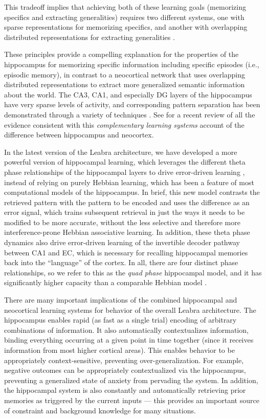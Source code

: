 \documentclass[11pt,twoside]{article}
\begin{document}
This tradeoff implies that achieving both of these learning goals (memorizing
specifics and extracting generalities) requires two different systems, one
with sparse representations for memorizing specifics, and another with
overlapping distributed representations for extracting generalities
\cite{McClellandMcNaughtonOReilly95,SherrySchacter87}.

These principles provide a compelling explanation for the properties of the
hippocampus for memorizing specific information including specific episodes
(i.e., episodic memory), in contrast to a neocortical network that uses
overlapping distributed representations to extract more generalized semantic
information about the world.  The CA3, CA1, and especially DG layers of the
hippocampus have very sparse levels of activity, and corresponding pattern
separation has been demonstrated through a variety of techniques
\cite{GilbertKesnerLee01,LeutgebLeutgebMoserEtAl07,McHughJonesQuinnEtAl07,
  BakkerKirwanMillerEtAl08}.  See 
for a recent review of all the evidence consistent with this {\em
  complementary learning systems} account of the difference between
hippocampus and neocortex.

In the latest version of the Leabra architecture, we have developed a more
powerful version of hippocampal learning, which leverages the different theta
phase relationships of the hippocampal layers to drive error-driven learning
\cite{KetzEtAlInPrep}, instead of relying on purely Hebbian learning, which
has been a feature of most computational models of the hippocampus.  In brief,
this new model contrasts the retrieved pattern with the pattern to be encoded
and uses the difference as an error signal, which trains subsequent retrieval
in just the ways it needs to be modified to be more accurate, without the less
selective and therefore more interference-prone Hebbian associative learning.
In addition, these theta phase dynamics also drive error-driven learning of
the invertible decoder pathway between CA1 and EC, which is necessary for
recalling hippocampal memories back into the ``language'' of the cortex.  In
all, there are four distinct phase relationships, so we refer to this as the
{\em quad phase} hippocampal model, and it has significantly higher capacity
than a comparable Hebbian model \cite{KetzEtAlInPrep}.

There are many important implications of the combined hippocampal and
neocortical learning systems for behavior of the overall Leabra architecture.
The hippocampus enables rapid (as fast as a single trial) encoding of
arbitrary combinations of information.  It also automatically contextualizes
information, binding everything occurring at a given point in time together
(since it receives information from most higher cortical areas).  This enables
behavior to be appropriately context-sensitive, preventing
over-generalization.  For example, negative outcomes can be appropriately
contextualized via the hippocampus, preventing a generalized state of anxiety
from pervading the system.  In addition, the hippocampal system is also
constantly and automatically retrieving prior memories as triggered by the
current inputs --- this provides an important source of constraint and
background knowledge for many situations.
\end{document}
